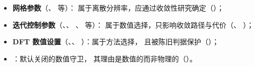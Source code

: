 \begin{itemize}[leftmargin=1.7em,itemsep=0.28em,topsep=0.35em]
  \item \textbf{网格参数}（、 等）：
        属于离散分辨率，应通过收敛性研究确定（）；
  \item \textbf{迭代控制参数}（、、
        、 等）：
        属于数值选择，只影响收敛路径与代价（、
        ）；
  \item \textbf{DFT 数值设置}（、、
        ）：属于方法选择，
        且被陈旧判据保护（）；
  \item \textbf{}：默认关闭的数值守卫，
        其理由是数值的而非物理的（）。
\end{itemize}

\cleardoublepage
